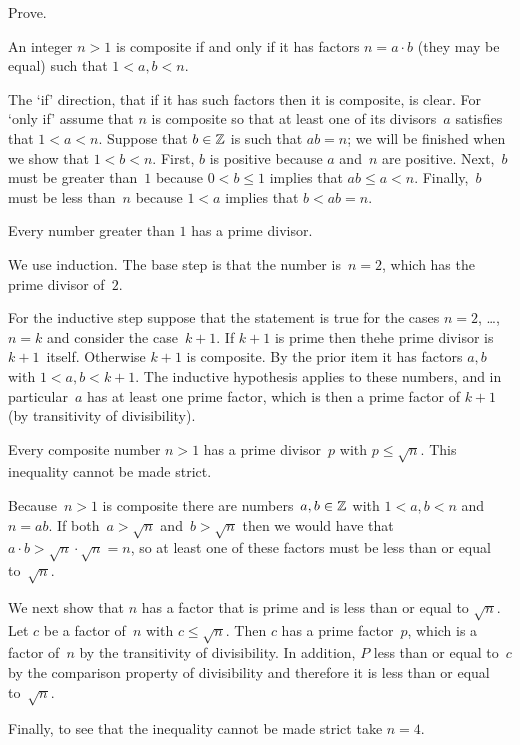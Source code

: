 \documentclass{ibl}  %
\begin{document}
\begin{problem} Prove.
\begin{exes}
\begin{exercise} 
  An integer $n>1$ is composite if and only if it has factors $n=a\cdot b$ 
  (they may be equal) 
  such that $1<a,b<n$.  
\end{exercise}
\begin{answer}
  The `if' direction, that if it has such factors then it is composite,
  is clear.
  For `only if' assume that $n$ is composite so
  that at least one of its divisors~$a$ satisfies that $1<a<n$.
  Suppose that $b\in\mathbb{Z}$ is such that $ab=n$; we will be finished when we show 
  that $1<b<n$.
  First, $b$ is positive because $a$ and~$n$ are positive.
  Next,~$b$ must be greater than~$1$ because $0<b\leq 1$ 
  implies that $ab\leq a<n$.
  Finally,~$b$ must be less than~$n$ because $1<a$ implies that $b<ab=n$.   
\end{answer}
\begin{exercise} 
  Every number greater than $1$ has a prime divisor.
\end{exercise}
\begin{answer}
  We use induction.
  The base step is that the number is~$n=2$, which has the prime divisor 
  of~$2$.

  For the inductive step suppose that the statement is true for the cases 
  $n=2$, \ldots, $n=k$ and consider the case~$k+1$.
  If $k+1$ is prime then thehe prime divisor is $k+1$~itself.
  Otherwise $k+1$ is composite.
  By the prior item it has factors $a,b$ with $1<a,b<k+1$.
  The inductive hypothesis applies to these numbers, and in particular~$a$ 
  has at least one prime factor, which is then a prime factor of $k+1$
  (by transitivity of divisibility).  
\end{answer}
\begin{exercise} 
  Every composite number $n>1$ has a prime divisor~$p$ 
  with $p\leq \sqrt{n}$. 
  This inequality cannot be made strict.
\end{exercise}
\begin{answer}
  Because~$n>1$ is composite there are numbers~$a,b\in\mathbb{Z}$ with
  $1<a,b<n$ and $n=ab$.
  If both~$a>\sqrt{n}$ and~$b>\sqrt{n}$ then we would have that
  $a\cdot b>\sqrt{n}\cdot\sqrt{n}=n$,
  so at least one of these factors must be less than or equal 
  to~$\sqrt{n}$.

  We next show that $n$ has a factor that is prime and is less than or
  equal to $\sqrt{n}$.
  Let $c$ be a factor of~$n$ with $c\leq\sqrt{n}$.
  Then $c$ has a prime factor~$p$, which
  is a factor of~$n$ by the transitivity of divisibility. 
  In addition, $P$
  less than or equal to~$c$ by the comparison property of divisibility
  and therefore
  it is less than or equal to~$\sqrt{n}$.    

  Finally, to see that the inequality cannot be made strict take $n=4$.  
\end{answer}
\end{exes}
\end{problem}                   
\end{document}
